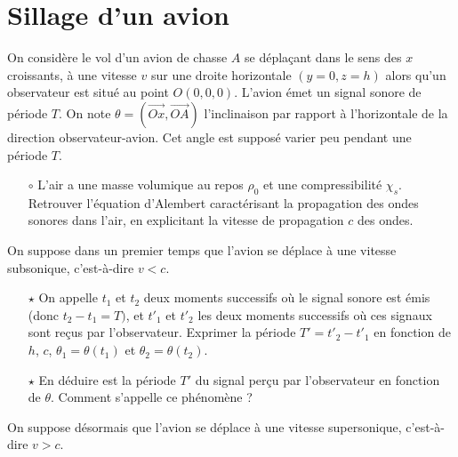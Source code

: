 \documentclass{report}
\begin{document}
\section*{Sillage d'un avion}

On considère le vol d'un avion de chasse $A$ se déplaçant dans le sens des $x$ croissants, à une vitesse $v$ sur une droite horizontale $(y=0,z=h)$ alors qu'un observateur est situé au point $O(0,0,0)$. L'avion émet un signal sonore de période $T$. On note $\theta=(\vec{Ox},\vec{OA})$ l'inclinaison par rapport à l'horizontale de la direction observateur-avion. Cet angle est supposé varier peu pendant une période $T$.

\begin{itemize}

	\item[$\circ$] L'air a une masse volumique au repos $\rho_0$ et une compressibilité $\chi_s$. Retrouver l'équation d'Alembert caractérisant la propagation des ondes sonores dans l'air, en explicitant la vitesse de propagation $c$ des ondes.

\end{itemize}

On suppose dans un premier temps que l'avion se déplace à une vitesse subsonique, c'est-à-dire $v<c$.

\begin{itemize}

	\item[$\star$] On appelle $t_1$ et $t_2$ deux moments successifs où le signal sonore est émis (donc $t_2-t_1=T)$, et $t'_1$ et $t'_2$ les deux moments successifs où ces signaux sont reçus par l'observateur. Exprimer la période $T'=t'_2-t'_1$ en fonction de $h$, $c$, $\theta_1=\theta(t_1)$ et $\theta_2=\theta(t_2)$. 
	
	\item[$\star$] En déduire est la période $T'$ du signal perçu par l'observateur en fonction de $\theta$. Comment s'appelle ce phénomène ?

\end{itemize}

On suppose désormais que l'avion se déplace à une vitesse supersonique, c'est-à-dire $v>c$.
\end{document}
